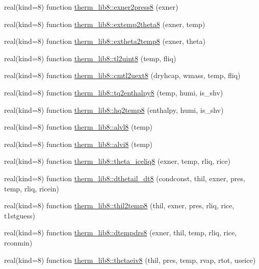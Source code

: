 \begin{DoxyCompactItemize}
real(kind=8) function \hyperlink{namespacetherm__lib8_a790e9ad68221393de29c2383a301da8e}{therm\+\_\+lib8\+::exner2press8} (exner)
\item 
real(kind=8) function \hyperlink{namespacetherm__lib8_a309e38d181bfb3eea47d3f220e44b923}{therm\+\_\+lib8\+::extemp2theta8} (exner, temp)
\item 
real(kind=8) function \hyperlink{namespacetherm__lib8_ac210423ab55881e57a525b8f13593fa3}{therm\+\_\+lib8\+::extheta2temp8} (exner, theta)
\item 
real(kind=8) function \hyperlink{namespacetherm__lib8_afb21e6b55b53bbc124c228e01ccc60cb}{therm\+\_\+lib8\+::tl2uint8} (temp, fliq)
\item 
real(kind=8) function \hyperlink{namespacetherm__lib8_af5c7259346e1ee029458410d49100d77}{therm\+\_\+lib8\+::cmtl2uext8} (dryhcap, wmass, temp, fliq)
\item 
real(kind=8) function \hyperlink{namespacetherm__lib8_abc11d3a9518a513fd0b3b97e6fc0e68e}{therm\+\_\+lib8\+::tq2enthalpy8} (temp, humi, is\+\_\+shv)
\item 
real(kind=8) function \hyperlink{namespacetherm__lib8_a1ffd2b0e4437b77b168fa1df97e641ca}{therm\+\_\+lib8\+::hq2temp8} (enthalpy, humi, is\+\_\+shv)
\item 
real(kind=8) function \hyperlink{namespacetherm__lib8_a8dfe9d6c06c19f28e388354ce1001ec2}{therm\+\_\+lib8\+::alvl8} (temp)
\item 
real(kind=8) function \hyperlink{namespacetherm__lib8_a3b1992f0fffee3a316b79819cac27382}{therm\+\_\+lib8\+::alvi8} (temp)
\item 
real(kind=8) function \hyperlink{namespacetherm__lib8_a7d5573528d5f5adeb9beb594eead7f4f}{therm\+\_\+lib8\+::theta\+\_\+iceliq8} (exner, temp, rliq, rice)
\item 
real(kind=8) function \hyperlink{namespacetherm__lib8_a88d5c007e6cd1a34788af6ac891d6c01}{therm\+\_\+lib8\+::dthetail\+\_\+dt8} (condconst, thil, exner, pres, temp, rliq, ricein)
\item 
real(kind=8) function \hyperlink{namespacetherm__lib8_a7d009d0d3507e656b58c9eb70c747598}{therm\+\_\+lib8\+::thil2temp8} (thil, exner, pres, rliq, rice, t1stguess)
\item 
real(kind=8) function \hyperlink{namespacetherm__lib8_af3b110a715728849ed26074d4675f0e8}{therm\+\_\+lib8\+::dtempdrs8} (exner, thil, temp, rliq, rice, rconmin)
\item 
real(kind=8) function \hyperlink{namespacetherm__lib8_aca0eeff24415eab272c13efcba42ebd5}{therm\+\_\+lib8\+::thetaeiv8} (thil, pres, temp, rvap, rtot, useice)

\end{DoxyCompactItemize}
